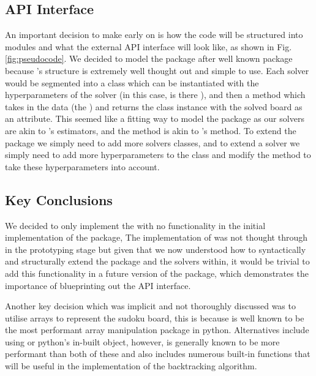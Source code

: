     \subsection{API Interface}\label{subsec:api-interface}
    An important decision to make early on is how the code will be structured into modules and what the external
    API interface will look like, as shown in Fig.\eqref{fig:pseudocode}.
    We decided to model the  package after well known  \cite{scikit-repo}
    package because 's structure is extremely well thought out and simple to use.
    Each solver would be segmented into a class which can be instantiated with the hyperparameters
    of the solver (in this case, is there ), and then a  method which
    takes in the data (the ) and returns the class instance with the solved board as an attribute.
    This seemed like a fitting way to model the package as our solvers are akin to 's estimators,
    and the  method is akin to 's  method.
    To extend the package we simply need to add more solvers classes, and to extend a solver we simply need
    to add more hyperparameters to the class and modify the  method to take these hyperparameters into
    account.

    \subsection{Key Conclusions}\label{subsec:key-conclusions}
    We decided to only implement the  with no  functionality
    in the initial  implementation of the package,
    The implementation of  was not thought through in the prototyping stage but given that
    we now understood how to syntactically and structurally extend the package and the solvers within, it would be trivial
    to add this functionality in a future version of the package, which demonstrates the importance of blueprinting out
    the API interface.

    Another key decision which was implicit and not thoroughly discussed was to utilise  arrays to
    represent the sudoku board, this is because  is well known to be the most performant array manipulation
    package in python.
    Alternatives include using  or python's in-built  object, however, 
    is generally known to be more performant than both of these and  also includes numerous built-in functions
    that will be useful in the implementation of the backtracking algorithm.

